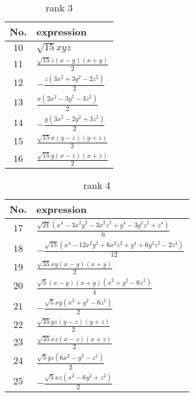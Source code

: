 \documentclass[fleqn,8pt,landscape]{jsarticle}
\begin{document}
\begin{table}[ht!]
\begin{center}
\caption{rank 3}
\renewcommand{\arraystretch}{1.3}
\begin{tabular}{cl} \hline \hline
No. & expression \\ \hline
$ 10 $ & $ \sqrt{15} x y z $ \\
$ 11 $ & $ \frac{\sqrt{15} z \left(x - y\right) \left(x + y\right)}{2} $ \\
$ 12 $ & $ - \frac{z \left(3 x^{2} + 3 y^{2} - 2 z^{2}\right)}{2} $ \\
$ 13 $ & $ \frac{x \left(2 x^{2} - 3 y^{2} - 3 z^{2}\right)}{2} $ \\
$ 14 $ & $ - \frac{y \left(3 x^{2} - 2 y^{2} + 3 z^{2}\right)}{2} $ \\
$ 15 $ & $ \frac{\sqrt{15} x \left(y - z\right) \left(y + z\right)}{2} $ \\
$ 16 $ & $ \frac{\sqrt{15} y \left(x - z\right) \left(x + z\right)}{2} $ \\
 \hline \hline
\end{tabular}
\end{center}
\end{table}
\begin{table}[ht!]
\begin{center}
\caption{rank 4}
\renewcommand{\arraystretch}{1.3}
\begin{tabular}{cl} \hline \hline
No. & expression \\ \hline
$ 17 $ & $ \frac{\sqrt{21} \left(x^{4} - 3 x^{2} y^{2} - 3 x^{2} z^{2} + y^{4} - 3 y^{2} z^{2} + z^{4}\right)}{6} $ \\
$ 18 $ & $ - \frac{\sqrt{15} \left(x^{4} - 12 x^{2} y^{2} + 6 x^{2} z^{2} + y^{4} + 6 y^{2} z^{2} - 2 z^{4}\right)}{12} $ \\
$ 19 $ & $ \frac{\sqrt{35} x y \left(x - y\right) \left(x + y\right)}{2} $ \\
$ 20 $ & $ \frac{\sqrt{5} \left(x - y\right) \left(x + y\right) \left(x^{2} + y^{2} - 6 z^{2}\right)}{4} $ \\
$ 21 $ & $ - \frac{\sqrt{5} x y \left(x^{2} + y^{2} - 6 z^{2}\right)}{2} $ \\
$ 22 $ & $ \frac{\sqrt{35} y z \left(y - z\right) \left(y + z\right)}{2} $ \\
$ 23 $ & $ \frac{\sqrt{35} x z \left(x - z\right) \left(x + z\right)}{2} $ \\
$ 24 $ & $ \frac{\sqrt{5} y z \left(6 x^{2} - y^{2} - z^{2}\right)}{2} $ \\
$ 25 $ & $ - \frac{\sqrt{5} x z \left(x^{2} - 6 y^{2} + z^{2}\right)}{2} $ \\
 \hline \hline
\end{tabular}
\end{center}
\end{table}
\end{document}
